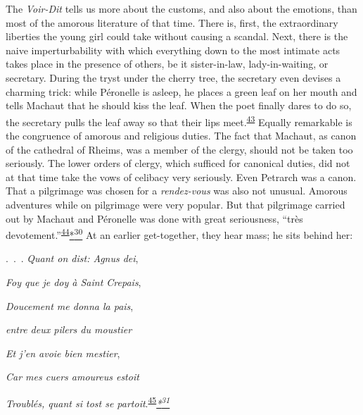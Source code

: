 The \emph{Voir-Dit} tells us more about the customs, and also about the
emotions, than most of the amorous literature of that time. There is,
first, the extraordinary liberties the young girl could take without
causing a scandal. Next, there is the naive imperturbability with which
everything down to the most intimate acts takes place in the presence of
others, be it sister-in-law, lady-in-waiting, or secretary. During the
tryst under the cherry tree, the secretary even devises a charming
trick: while Péronelle is asleep, he places a green leaf on her mouth
and tells Machaut that he should kiss the leaf. When the poet finally
dares to do so, the secretary pulls the leaf away so that their lips
meet.\textsuperscript{\protect\hypertarget{11_Chapter_Four__THE_FORMS_OF_LOVE.xhtmlux5cux23id_1403}{\protect\hyperlink{23_NOTES.xhtmlux5cux23id_1404}{43}}}
Equally remarkable is the congruence of amorous and religious duties.
The fact that Machaut, as canon of the cathedral of Rheims, was a member
of the clergy, should not be taken too seriously. The lower orders of
clergy, which sufficed for canonical duties, did not at that time take
the vows of celibacy very seriously. Even Petrarch was a canon. That a
pilgrimage was chosen for a \emph{rendez-vous} was also not unusual.
Amorous adventures while on pilgrimage were very popular. But that
pilgrimage carried out by Machaut and Péronelle was done with great
seriousness, ``très
devotement.''\textsuperscript{\protect\hypertarget{11_Chapter_Four__THE_FORMS_OF_LOVE.xhtmlux5cux23id_1401}{\protect\hyperlink{23_NOTES.xhtmlux5cux23id_1402}{44}}}\protect\hypertarget{11_Chapter_Four__THE_FORMS_OF_LOVE.xhtmlux5cux23id_3157}{\protect\hyperlink{23_NOTES.xhtmlux5cux23id_3158}{*\textsuperscript{30}}}
At an earlier get-together, they hear mass; he sits behind her:

.~.~.
\protect\hypertarget{11_Chapter_Four__THE_FORMS_OF_LOVE.xhtmlux5cux23page_147}{}{}\emph{Quant
on dist: Agnus dei},

\emph{Foy que je doy à Saint Crepais},

\emph{Doucement me donna la pais},

\emph{entre deux pilers du moustier}

\emph{Et j'en avoie bien mestier},

\emph{Car mes cuers amoureus estoit}

\emph{Troublés, quant si tost se
partoit}.\textsuperscript{\protect\hypertarget{11_Chapter_Four__THE_FORMS_OF_LOVE.xhtmlux5cux23id_1399}{\protect\hyperlink{23_NOTES.xhtmlux5cux23id_1400}{45}}}\emph{\protect\hypertarget{11_Chapter_Four__THE_FORMS_OF_LOVE.xhtmlux5cux23id_3159}{\protect\hyperlink{23_NOTES.xhtmlux5cux23id_3160}{*\textsuperscript{31}}}}

